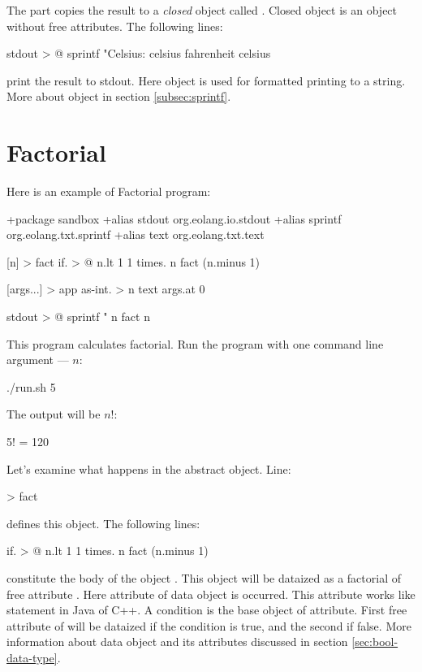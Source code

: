 \documentclass[12pt]{book}
\begin{document}
The  part copies the result to a \textit{closed} object called . Closed object is an object without free attributes. The following lines: 
\begin{ffcode}
stdout > @
  sprintf
    "Celsius: %
    celsius
    fahrenheit celsius
\end{ffcode}
print the result to stdout. Here  object is used for formatted printing to a string. More about  object in section \ref{subsec:sprintf}.

\section{Factorial}

Here is an example of Factorial program:

\begin{ffcode}
+package sandbox
+alias stdout org.eolang.io.stdout
+alias sprintf org.eolang.txt.sprintf
+alias text org.eolang.txt.text

[n] > fact
  if. > @
    n.lt 1
    1
    times.
      n
      fact (n.minus 1)

[args...] > app
  as-int. > n
    text
      args.at 0

  stdout > @
    sprintf
      "%
      n
      fact n
      
\end{ffcode}

This program calculates factorial. Run the program with one command line argument —  $n$:
\begin{ffcode}
./run.sh 5
\end{ffcode}
The output will be $n!$:
\begin{ffcode}
5! = 120
\end{ffcode}

Let's examine what happens in the  abstract object. Line:
\begin{ffcode}
[n] > fact
\end{ffcode}
defines this object. The following lines:
\begin{ffcode}
if. > @
  n.lt 1
  1
  times.
    n
    fact (n.minus 1)
\end{ffcode}
constitute the body of the object . This object will be dataized as a factorial of free attribute . Here  attribute of  data object is occurred. This attribute works like  statement in Java of C++. A condition is the base object of  attribute. First free attribute of  will be dataized if the condition is true, and the second if false. More information about  data object and its attributes discussed in section \ref{sec:bool-data-type}.
\end{document}
